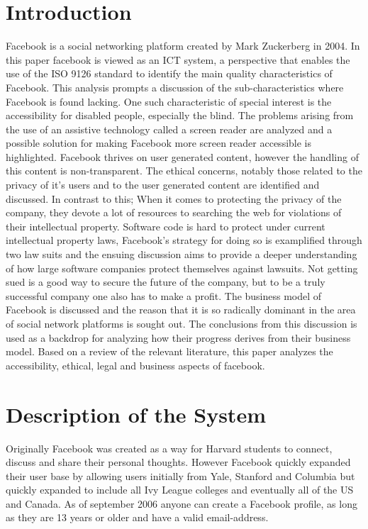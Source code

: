 \documentclass[conference]{IEEEtran}
\begin{document}
\section{Introduction}
Facebook is a social networking platform created by Mark Zuckerberg in 2004.
In this paper facebook is viewed as an ICT system, a perspective that enables
the use of the ISO 9126 standard to identify the main quality characteristics of Facebook.
This analysis prompts a discussion of the sub-characteristics where Facebook is found
lacking. One such characteristic of special interest is the accessibility for
disabled people, especially the blind. The problems arising from the use of an
assistive technology called a screen reader are analyzed and a possible
solution for making Facebook more screen reader accessible is highlighted.
Facebook thrives on user generated content, however the handling of this
content is non-transparent. The ethical concerns, notably those related to the
privacy of it's users and to the user generated content are identified and
discussed. In contrast to this; When it comes to protecting the privacy of the
company, they devote a lot of resources to searching the web for violations of
their intellectual property. Software code is hard to protect under current
intellectual property laws, Facebook's strategy for doing so is examplified
through two law suits and the ensuing discussion aims to provide a deeper
understanding of how large software companies protect themselves against
lawsuits. Not getting sued is a good way to secure the future of the company,
but to be a truly successful company one also has to make a profit. The
business model of Facebook is discussed and the reason that it is so radically
dominant in the area of social network platforms is sought out. The conclusions
from this discussion is used as a backdrop for analyzing how their progress
derives from their business model. Based on a review of the relevant
literature, this paper analyzes the accessibility, ethical, legal and business
aspects of facebook.

\section{Description of the System}
\label{system}

Originally Facebook was created as a way for Harvard students to connect, discuss and share their personal thoughts. However Facebook quickly expanded their user base by allowing users initially from Yale, Stanford and Columbia but quickly expanded to include all Ivy League colleges and eventually all of the US and Canada.\cite{FacebookHistoryWiki2014} As of september 2006 anyone can create a Facebook profile, as long as they are 13 years or older and have a valid email-address. \cite{JohnStrickland2007}
\end{document}
